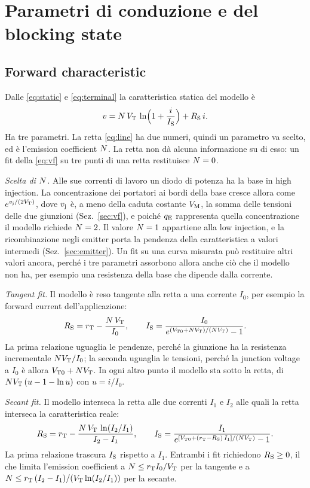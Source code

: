 \documentclass[10pt,a4paper]{scrartcl}
\let\newcommand\pdvaluedefine
\newcommand{\qE}{q_\mathrm{E}}
\newcommand{\vj}{v_\mathrm{j}}
\newcommand{\IS}{I_\mathrm{S}}
\newcommand{\RS}{R_\mathrm{S}}
\newcommand{\VT}{V_\mathrm{T}}
\newcommand{\VTo}{V_\mathrm{T0}}
\newcommand{\rT}{r_\mathrm{T}}
\newcommand{\Nem}{N}                          %
\newcommand{\VM}{V_\mathrm{M}}
\begin{document}
\section{Parametri di conduzione e del blocking state}
\label{sec:static}
\subsection{Forward characteristic}
\label{sec:forward}
Dalle \eqref{eq:static} e \eqref{eq:terminal} la caratteristica statica del modello è
\begin{equation}
v = \Nem\,\VT\,\ln\Bigl(1 + \frac{i}{\IS}\Bigr) + \RS\, i .
\label{eq:vf}
\end{equation}
Ha tre parametri. La retta \eqref{eq:line} ha due numeri, quindi un parametro va scelto, ed è l'emission coefficient $\Nem$. La retta non dà alcuna informazione su di esso: un fit della \eqref{eq:vf} su tre punti di una retta restituisce $\Nem = 0$.

\emph{Scelta di $\Nem$.} Alle sue correnti di lavoro un diodo di potenza ha la base in high injection. La concentrazione dei portatori ai bordi della base cresce allora come $e^{\vj/(2\VT)}$, dove $\vj$ è, a meno della caduta costante $\VM$, la somma delle tensioni delle due giunzioni (Sez.~\ref{sec:vf}), e poiché $\qE$ rappresenta quella concentrazione il modello richiede $\Nem = 2$. Il valore $\Nem = 1$ appartiene alla low injection, e la ricombinazione negli emitter porta la pendenza della caratteristica a valori intermedi (Sez.~\ref{sec:emitter}). Un fit su una curva misurata può restituire altri valori ancora, perché i tre parametri assorbono allora anche ciò che il modello non ha, per esempio una resistenza della base che dipende dalla corrente.

\emph{Tangent fit.} Il modello è reso tangente alla retta a una corrente $I_0$, per esempio la forward current dell'applicazione:
\begin{equation}
\RS = \rT - \frac{\Nem\,\VT}{I_0} , \qquad \IS = \frac{I_0}{e^{(\VTo + \Nem\VT)/(\Nem\VT)} - 1} .
\label{eq:tangent}
\end{equation}
La prima relazione uguaglia le pendenze, perché la giunzione ha la resistenza incrementale $\Nem\VT/I_0$; la seconda uguaglia le tensioni, perché la junction voltage a $I_0$ è allora $\VTo + \Nem\VT$. In ogni altro punto il modello sta sotto la retta, di $\Nem\VT\,(u - 1 - \ln u)$ con $u = i/I_0$.

\emph{Secant fit.} Il modello interseca la retta alle due correnti $I_1$ e $I_2$ alle quali la retta interseca la caratteristica reale:
\begin{equation}
\RS = \rT - \frac{\Nem\,\VT\,\ln(I_2/I_1)}{I_2 - I_1} , \qquad \IS = \frac{I_1}{e^{[\VTo + (\rT-\RS)\,I_1]/(\Nem\VT)} - 1} .
\label{eq:secant}
\end{equation}
La prima relazione trascura $\IS$ rispetto a $I_1$. Entrambi i fit richiedono $\RS \geq 0$, il che limita l'emission coefficient a $\Nem \leq \rT I_0/\VT$ per la tangente e a $\Nem \leq \rT\,(I_2-I_1)/(\VT\ln(I_2/I_1))$ per la secante.
\end{document}

